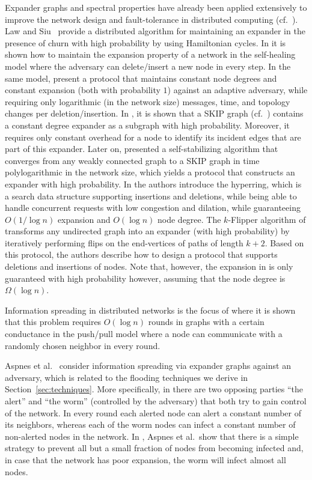 \documentclass[leqno,11pt]{article}
\begin{document}
Expander graphs and spectral properties have already been applied
extensively to improve the network design and fault-tolerance in
distributed computing (cf.\ \cite{Upfal94,DPPU88,BBCES2006}).
Law and Siu\ \cite{LS03} provide a distributed algorithm for maintaining an expander in
the presence of churn with high probability by using Hamiltonian cycles.
In \cite{PT11} it is shown how to maintain the expansion property of a network
in the self-healing model where the adversary can delete/insert a new node in
every step.
In the same model, \cite{IPDPS14} present a protocol that maintains constant node degrees and constant expansion (both with probability $1$) against an adaptive adversary, while requiring only logarithmic (in the network size) messages, time, and topology changes per deletion/insertion.
In \cite{skipexp}, it is shown that a SKIP graph (cf.\ \cite{skip}) contains a constant degree expander as a subgraph with high probability.
Moreover, it requires only constant overhead for a node to identify its incident edges that are part of this expander.
Later on, \cite{skipplus} presented a self-stabilizing algorithm that converges from any weakly connected graph to a SKIP graph in time polylogarithmic in the network size, which yields a protocol that constructs an expander with high probability.
In  \cite{hyperring} the authors introduce the hyperring, which is a search data structure supporting insertions and deletions, while being able to handle concurrent requests with low congestion and dilation, while guaranteeing $O(1/\log n)$ expansion and $O(\log n)$ node degree.
The $k$-Flipper algorithm of \cite{mahlmann} transforms any undirected graph into an expander (with high probability) by iteratively performing flips on the end-vertices of paths of length $k+2$.
Based on this protocol, the authors describe how to design a protocol that supports deletions and insertions of nodes.
Note that, however, the expansion in \cite{mahlmann} is only guaranteed with high probability however, assuming that the node degree is $\Omega(\log n)$.

Information spreading in distributed networks is the focus of
\cite{CH:PODC10} where it is shown that this problem requires $O(\log n)$
rounds in graphs with a certain conductance in the push/pull model 
where a node can communicate with a
randomly chosen neighbor in every round. 

Aspnes et al.\ \cite{ARS07} consider information spreading via expander
graphs against an adversary, which is related to the flooding
techniques we derive in Section~\ref{sec:techniques}. More specifically,
in \cite{ARS07} there are two opposing parties ``the alert'' and ``the
worm'' (controlled by the adversary) that both try to gain control of the
network. In every round each alerted node can alert a constant number of
its neighbors, whereas each of the worm nodes can infect a constant
number of non-alerted nodes in the network. In \cite{ARS07}, Aspnes et al.\ show that there is a simple strategy to prevent all
but a small fraction of nodes from becoming infected and, in case that the
network has poor expansion, the worm will infect almost all nodes.
\end{document}
